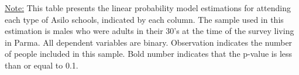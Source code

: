 \begin{footnotesize}
\noindent\underline{Note:} This table presents the linear probability model estimations for attending each type of Asilo schools, indicated by each column. The sample used in this estimation is males who were adults in their 30's at the time of the survey living in Parma. All dependent variables are binary. Observation indicates the number of people included in this sample. Bold number indicates that the p-value is less than or equal to 0.1.
\end{footnotesize}
